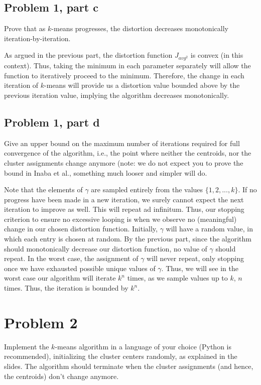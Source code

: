 \newpage
\subsection{Problem 1, part c}
Prove that as $k$-means progresses, the distortion decreases monotonically iteration-by-iteration. 
\partbreak
\begin{solution}

    As argued in the previous part, the distortion function $J_{avg^2}$ is convex (in this context). Thus, taking the minimum in each parameter separately will allow the function to iteratively proceed to the minimum. Therefore, the change in each iteration of $k$-means will provide us a distortion value bounded above by the previous iteration value, implying the algorithm decreases monotonically. 
\end{solution}

\newpage
\subsection{Problem 1, part d}
Give an upper bound on the maximum number of iterations required for full convergence of the algorithm, i.e., the point where neither the centroids, nor the cluster assignments change anymore (note: we do not expect you to prove the bound in Inaba et al., something much looser and simpler will do. 
\partbreak
\begin{solution}

    Note that the elements of $\gamma$ are sampled entirely from the values $\{1, 2, ..., k\}$. If no progress have been made in a new iteration, we surely cannot expect the next iteration to improve as well. This will repeat ad infinitum. Thus, our stopping criterion to ensure no excessive looping is when we observe no (meaningful) change in our chosen distortion function. Initially, $\gamma$ will have a random value, in which each entry is chosen at random. By the previous part, since the algorithm should monotonically decrease our distortion function, no value of $\gamma$ should repeat. In the worst case, the assignment of $\gamma$ will never repeat, only stopping once we have exhausted possible unique values of $\gamma$. Thus, we will see in the worst case our algorithm will iterate $k^n$ times, as we sample values up to $k$, $n$ times. Thus, the iteration is bounded by $k^n$. 
\end{solution}

\newpage
\section{Problem 2}
Implement the $k$-means algorithm in a language of your choice (Python is recommended), initializing the cluster centers randomly, as explained in the slides. The algorithm should terminate when the cluster assignments (and hence, the centroids) don’t change anymore.

